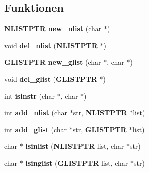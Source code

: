 \subsection*{Funktionen}
\begin{CompactItemize}
\item 
{\bf NLISTPTR} {\bf new\_\-nlist} (char $\ast$)
\item 
void {\bf del\_\-nlist} ({\bf NLISTPTR} $\ast$)
\item 
{\bf GLISTPTR} {\bf new\_\-glist} (char $\ast$, char $\ast$)
\item 
void {\bf del\_\-glist} ({\bf GLISTPTR} $\ast$)
\item 
int {\bf isinstr} (char $\ast$, char $\ast$)
\item 
int {\bf add\_\-nlist} (char $\ast$str, {\bf NLISTPTR} $\ast$list)
\item 
int {\bf add\_\-glist} (char $\ast$str, {\bf GLISTPTR} $\ast$list)
\item 
char $\ast$ {\bf isinlist} ({\bf NLISTPTR} list, char $\ast$str)
\item 
char $\ast$ {\bf isinglist} ({\bf GLISTPTR} list, char $\ast$str)
\end{CompactItemize}
